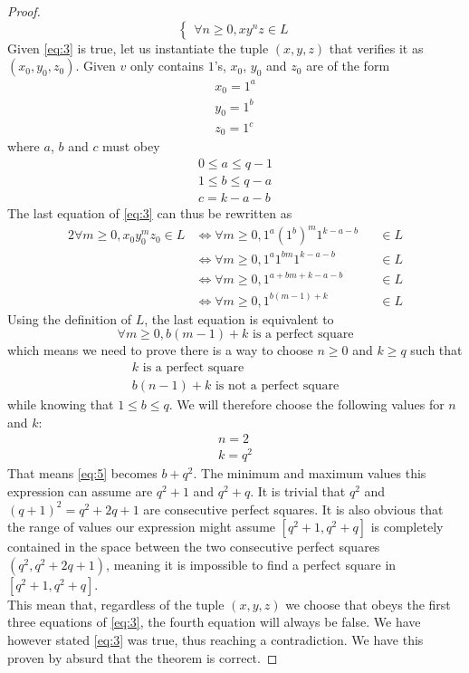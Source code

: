 {\begin{proof}
\begin{equation}
\begin{cases}
		\forall n \geq 0, x y^n z \in L
	\end{cases}
\end{equation}
Given \eqref{eq:3} is true, let us instantiate the tuple $(x,y,z)$ that verifies it as $(x_0,y_0,z_0)$. Given $v$ only contains $1$'s, $x_0$, $y_0$ and $z_0$ are of the form
\begin{gather*}
	x_0=1^a\\
	y_0=1^b\\
	z_0=1^c
\end{gather*}
where $a$, $b$ and $c$ must obey
\begin{gather*}
	0 \leq a \leq q-1\\
	1 \leq b \leq q-a\\
	c = k-a-b
\end{gather*}
The last equation of \eqref{eq:3} can thus be rewritten as
\begin{alignat*}{2}
	\forall m \geq 0, x_0 y_0^m z_0 \in L
	&\iff \forall m \geq 0, 1^a {(1^b)}^m 1^{k-a-b} &&\in L\\
	&\iff \forall m \geq 0, 1^a 1^{bm} 1^{k-a-b}    &&\in L\\
	&\iff \forall m \geq 0, 1^{a+bm+k-a-b}          &&\in L\\
	&\iff \forall m \geq 0, 1^{b(m-1)+k}            &&\in L
\end{alignat*}
Using the definition of $L$, the last equation is equivalent to
\begin{equation*}
	\forall m \geq 0, b(m-1)+k \text{ is a perfect square}\end{equation*}
which means we need to prove there is a way to choose $n \geq 0$ and $k \geq q$ such that
\begin{gather}
	\label{eq:4} k \text{ is a perfect square}\\
	\label{eq:5} b(n-1)+k \text{ is not a perfect square}
\end{gather}
while knowing that $1 \leq b \leq q$.
We will therefore choose the following values for $n$ and $k$:
\begin{gather*}
	n = 2\\
	k = q^2
\end{gather*}
That means \eqref{eq:5} becomes $b+q^2$. The minimum and maximum values this expression can assume are $q^2+1$ and $q^2+q$. It is trivial that $q^2$ and $(q+1)^2=q^2+2q+1$ are consecutive perfect squares. It is also obvious that the range of values our expression might assume $[q^2+1,q^2+q]$ is completely contained in the space between the two consecutive perfect squares $(q^2, q^2+2q+1)$, meaning it is impossible to find a perfect square in $[q^2+1,q^2+q]$.\\
This mean that, regardless of the tuple $(x,y,z)$ we choose that obeys the first three equations of \eqref{eq:3}, the fourth equation will always be false. We have however stated \eqref{eq:3} was true, thus reaching a contradiction. We have this proven by absurd that the theorem is correct.
\end{proof}
}

